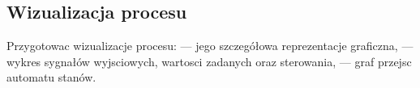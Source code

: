 \subsection{Wizualizacja procesu}
\label{lab:zad12}



\ifdefined\CompileFigures
%    
\fi

Przygotowac wizualizacje procesu:
— jego szczegółowa reprezentacje graficzna,
— wykres sygnałów wyjsciowych, wartosci zadanych oraz sterowania,
— graf przejsc automatu stanów.

\newpage
